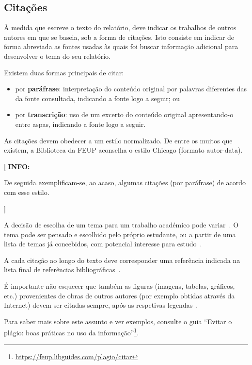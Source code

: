 \documentclass[11pt,a4paper]{report}
\newenvironment{info}[1]{\vspace*{6mm}\color{blue}[ \textbf{INFO:} \begin{em} #1}
                        {\vspace*{3mm}\end{em} ]}
\begin{document}
\lipsum[6]

\subsection*{Citações}

À medida que escreve o texto do relatório, deve indicar os trabalhos
de outros autores em que se baseia, sob a forma de citações.
Isto consiste em indicar de forma abreviada as fontes usadas às quais
foi buscar informação adicional para desenvolver o tema do seu
relatório.

Existem duas formas principais de citar:
\begin{itemize}
\item por \textbf{paráfrase}: interpretação do conteúdo original por
  palavras diferentes das da fonte consultada, indicando a fonte logo
  a seguir; ou 
\item 
  por \textbf{transcrição}: uso de um excerto do conteúdo original
  apresentando-o entre aspas, indicando a fonte logo a seguir.
\end{itemize}

As citações devem obedecer a um estilo normalizado.
De entre os muitos que existem, a Biblioteca da FEUP aconselha o
estilo Chicago (formato autor-data).

\begin{info}
De seguida exemplificam-se, ao acaso, algumas citações (por paráfrase)
de acordo com esse estilo.
\end{info}

A decisão de escolha de um tema para um trabalho académico pode
variar~\cite{kn:Bel02-book}.
O tema pode ser pensado e escolhido pelo próprio estudante, ou a
partir de uma lista de temas já concebidos, com potencial interesse
para estudo~\cite{kn:GLPR14-joPhysics}.

A cada citação ao longo do texto deve corresponder uma referência
indicada na lista final de referências
bibliográficas~\cite{kn:Lip08,kn:MSS+12-wemep,kn:VKL+18-dtu}. 

É importante não esquecer que também as figuras (imagens, tabelas,
gráficos, etc.) provenientes de obras de outros autores (por exemplo 
obtidas através da Internet) devem ser citadas sempre, após as
respetivas legendas~\cite{kn:GLPC22-torque}.

Para saber mais sobre este assunto e ver exemplos, consulte o guia
``Evitar o plágio: boas práticas no uso da
informação''\footnote{\url{https://feup.libguides.com/plagio/citar}}.  
\end{document}
